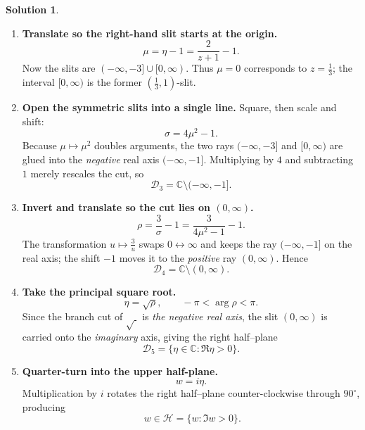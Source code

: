 \documentclass[12pt]{article}
\theoremstyle{definition} %
\newtheorem{solution}{Solution}
\theoremstyle{plain} %
\begin{document}
\begin{solution}
\begin{enumerate}[label=\textbf{Step \arabic*:}, itemsep=1.4ex]
          \item  \textbf{Translate so the right-hand slit starts at the origin.}
          \[
          \mu=\eta-1
            =\frac{2}{z+1}-1.
          \]
          Now the slits are
          \(
             (-\infty,-3] \cup [0,\infty).
          \)
          Thus $\mu=0$ corresponds to $z=\tfrac13$; the interval $[0,\infty)$
          is the former $(\tfrac13,1)$-slit.
          
          \item  \textbf{Open the symmetric slits into a single line.}
          Square, then scale and shift:
          \[
          \sigma
             =4\mu^{2}-1.
          \]
          Because $\mu\mapsto\mu^{2}$ doubles arguments,
          the two rays $(-\infty,-3]$ and $[0,\infty)$ are glued into the
          \emph{negative} real axis $(-\infty,-1]$.
          Multiplying by $4$ and subtracting $1$ merely rescales the cut,
          so
          \[
          \mathcal D_3
            = \mathbb{C}\setminus(-\infty,-1].
          \]
          
          \item  \textbf{Invert and translate so the cut lies on $(0,\infty)$.}
          \[
          \rho=\frac{3}{\sigma}-1
              =\frac{3}{4\mu^{2}-1}-1.
          \]
          The transformation $u\mapsto\frac{3}{u}$ swaps $0\leftrightarrow\infty$
          and keeps the ray $(-\infty,-1]$ on the real axis; the shift $-1$
          moves it to the \emph{positive} ray $(0,\infty)$.
          Hence
          \[
          \mathcal D_4
            = \mathbb{C}\setminus(0,\infty).
          \]
          
          \item \textbf{Take the principal square root.}
          \[
          \eta=\sqrt{\rho},
          \qquad -\pi<\arg\rho<\pi.
          \]
          Since the branch cut of $\sqrt{\;}$ is \emph{the negative real axis},
          the slit $(0,\infty)$ is carried onto the
          \emph{imaginary} axis, giving the right half–plane
          \[
          \mathcal D_5=\{\eta\in\mathbb{C}:\Re\eta>0\}.
          \]
          
          \item  \textbf{Quarter-turn into the upper half-plane.}
          \[
          w=i\eta.
          \]
          Multiplication by $i$ rotates the right half–plane
          counter-clockwise through $90^{\circ}$, producing
          \[
          \boxed{\;
             w\in\mathcal H=\{w:\Im w>0\}
           }.
          \]
          

\end{enumerate}
\end{solution}
\end{document}
